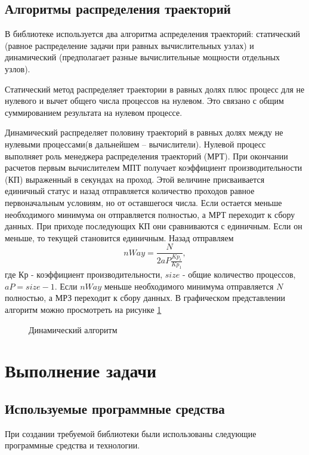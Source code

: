\section{Алгоритмы распределения траекторий}
В библиотеке используется два алгоритма аспределения траекторий: статический (равное распределение задачи при равных вычислительных узлах) и динамический (предполагает разные вычислительные мощности отдельных узлов).

Статический метод распределяет траектории в равных долях плюс процесс для не нулевого и вычет общего числа процессов на нулевом. Это связано с общим суммированием результата на нулевом процессе.

Динамический распределяет половину траекторий в равных долях между не нулевыми процессами(в дальнейшем -- вычислители). Нулевой процесс выполняет роль менеджера распределения траекторий (МРТ). При окончании расчетов первым вычислителем МПТ получает коэффициент производительности (КП) выраженный в секундах на проход. Этой величине присваивается единичный статус и назад отправляется количество проходов равное первоначальным условиям, но от оставшегося числа. Если остается меньше необходимого минимума он отправляется полностью, а МРТ переходит к сбору данных. При приходе последующих КП они сравниваются с единичным. Если он меньше, то текущей становится единичным. Назад отправляем \begin{equation} nWay = \frac{N}{2aP\frac{Kp_{i}}{Kp_{1}}}, \end{equation} где Кр - коэффициент производительности, $size$ - общие количество процессов, $aP=size-1$. Если $nWay$ меньше необходимого минимума отправляется $N$ полностью, а МРЗ переходит к сбору данных. В графическом представлении алгоритм можно просмотреть на рисунке \ref{staticAndDinamic}

\begin{figure}
\begin{small}

\end{small}
\caption{Динамический алгоритм}
\label{staticAndDinamic}
\end{figure}

\chapter{Выполнение задачи}
\section{Используемые программные средства}
При создании требуемой библиотеки были использованы следующие программные средства и технологии.   

